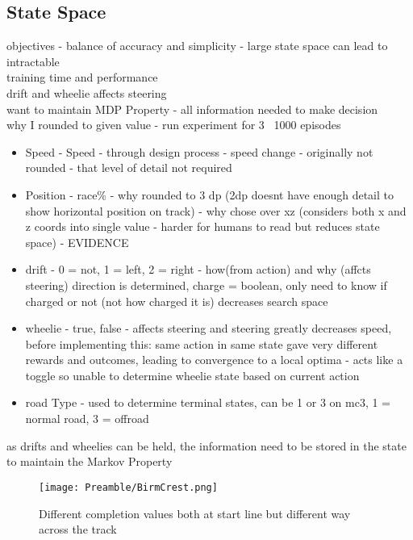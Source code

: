\subsection{State Space}
objectives - balance of accuracy and simplicity - large state space can lead to intractable 
\\ training time and performance
\\drift and wheelie affects steering
\\want to maintain MDP Property - all information needed to make decision 
\\ why I rounded to given value - run experiment for 3 ~1000 episodes
\begin{itemize}
    \item Speed - Speed - through design process - speed change - originally not rounded - that level of detail not required
    \item Position - race\% - why rounded to 3 dp (2dp doesnt have enough detail to show horizontal position on track) - why chose over xz (considers both x and z coords into single value - harder for humans to read but reduces state space) - EVIDENCE
    \item drift - 0 = not, 1 = left, 2 = right - how(from action) and why (affcts steering) direction is determined, charge = boolean, only need to know if charged or not (not how charged it is) decreases search space
    \item wheelie - true, false - affects steering and steering greatly decreases speed, before implementing this: same action in same state gave very different rewards and outcomes, leading to convergence to a local optima - acts like a toggle so unable to determine wheelie state based on current action
    \item road Type - used to determine terminal states, can be 1 or 3 on mc3, 1 = normal road, 3 = offroad
\end{itemize}
as drifts and wheelies can be held, the information need to be stored in the state to maintain the Markov Property
\begin{figure}[hb]
    \centering
    \texttt{[image: Preamble/BirmCrest.png]}
    \caption{Different completion values both at start line but different way across the track}
    \label{fig:completion-cross-track-difference}
\end{figure}
